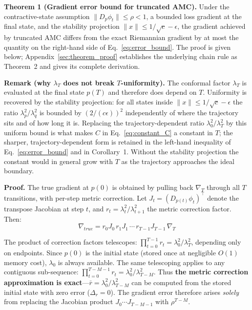 \documentclass[a4paper,fleqn]{cas-dc}
\begin{document}
\textbf{Theorem 1 (Gradient error bound for truncated AMC).}
Under the contractive-state assumption $\|D_{p}\phi_t\|\le\rho<1$, a bounded loss gradient at the final state, and the stability projection $\|x\|\le 1/\sqrt{c}-\epsilon$, the gradient achieved by truncated AMC differs from the exact Riemannian gradient by at most the quantity on the right-hand side of Eq.~\eqref{eq:error_bound}. The proof is given below; Appendix~\ref{sec:theorem_proof} establishes the underlying chain rule as Theorem~2 and gives its complete derivation.

\textbf{Remark (why $\lambda_T$ does not break $T$-uniformity).} The conformal factor $\lambda_T$ is evaluated at the final state $p(T)$ and therefore does depend on $T$. Uniformity is recovered by the stability projection: for all states inside $\|x\|\le 1/\sqrt{c}-\epsilon$ the ratio $\lambda_p^2/\lambda_q^2$ is bounded by $(2/(c\epsilon))^2$ independently of where the trajectory sits and of how long it is. Replacing the trajectory-dependent ratio $\lambda_0^2/\lambda_T^2$ by this uniform bound is what makes $C$ in Eq.~\eqref{eq:constant_C} a constant in $T$; the sharper, trajectory-dependent form is retained in the left-hand inequality of Eq.~\eqref{eq:error_bound} and in Corollary~1. Without the stability projection the constant would in general grow with $T$ as the trajectory approaches the ideal boundary.

\textbf{Proof.} The true gradient at $p(0)$ is obtained by pulling back $\nabla_T$ through all $T$ transitions, with per-step metric correction. Let $J_t = (D_{p(t)}\phi_t)^\top$ denote the transpose Jacobian at step $t$, and $r_t = \lambda_t^2/\lambda_{t+1}^2$ the metric correction factor. Then:
\begin{equation}
\nabla_{true} = r_0 J_0 \, r_1 J_1 \, \cdots \, r_{T-1} J_{T-1} \, \nabla_T
\end{equation}

The product of correction factors telescopes: $\prod_{t=0}^{T-1} r_t = \lambda_0^2/\lambda_T^2$, depending only on endpoints. Since $p(0)$ is the initial state (stored once at negligible $O(1)$ memory cost), $\lambda_0$ is always available. The same telescoping applies to any contiguous sub-sequence: $\prod_{t=0}^{T-M-1} r_t = \lambda_0^2/\lambda_{T-M}^2$. Thus \textbf{the metric correction approximation is exact}---$\bar{r} = \lambda_0^2/\lambda_{T-M}^2$ can be computed from the stored initial state with zero error ($\Delta_r = 0$). The gradient error therefore arises \textit{solely} from replacing the Jacobian product $J_0 \cdots J_{T-M-1}$ with $\rho^{T-M}$.
\end{document}
